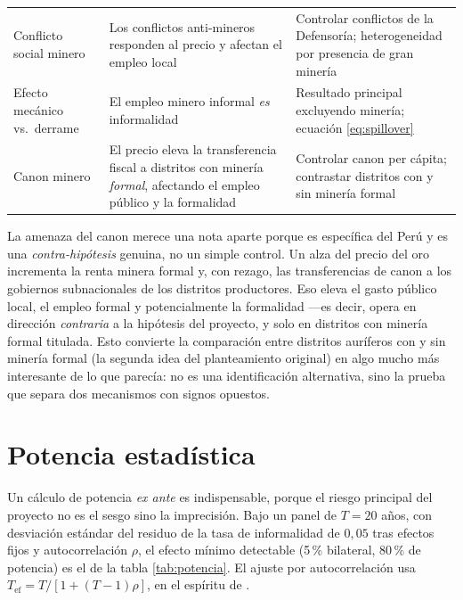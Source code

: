\documentclass[11pt,a4paper]{article}
\begin{document}
\begin{table}[h!]
\begin{tabularx}{\textwidth}{L{3.4cm} X L{4.6cm}}
\addlinespace
Conflicto social minero & Los conflictos anti-mineros responden al precio y afectan el empleo local & Controlar conflictos de la Defensoría; heterogeneidad por presencia de gran minería \\
\addlinespace
Efecto mecánico vs.\ derrame & El empleo minero informal \emph{es} informalidad & Resultado principal excluyendo minería; ecuación \eqref{eq:spillover} \\
\addlinespace
Canon minero & El precio eleva la transferencia fiscal a distritos con minería \emph{formal}, afectando el empleo público y la formalidad & Controlar canon per cápita; contrastar distritos con y sin minería formal \\
\bottomrule
\end{tabularx}
\end{table}

La amenaza del canon merece una nota aparte porque es específica del Perú y es una \emph{contra-hipótesis} genuina, no un simple control. Un alza del precio del oro incrementa la renta minera formal y, con rezago, las transferencias de canon a los gobiernos subnacionales de los distritos productores. Eso eleva el gasto público local, el empleo formal y potencialmente la formalidad ---es decir, opera en dirección \emph{contraria} a la hipótesis del proyecto, y solo en distritos con minería formal titulada. Esto convierte la comparación entre distritos auríferos con y sin minería formal (la segunda idea del planteamiento original) en algo mucho más interesante de lo que parecía: no es una identificación alternativa, sino la prueba que separa dos mecanismos con signos opuestos.

\section{Potencia estadística}\label{sec:potencia}

Un cálculo de potencia \emph{ex ante} es indispensable, porque el riesgo principal del proyecto no es el sesgo sino la imprecisión. Bajo un panel de $T=20$ años, con desviación estándar del residuo de la tasa de informalidad de $0{,}05$ tras efectos fijos y autocorrelación $\rho$, el efecto mínimo detectable (5\,\% bilateral, 80\,\% de potencia) es el de la tabla \ref{tab:potencia}. El ajuste por autocorrelación usa $T_{\text{ef}} = T/[1+(T-1)\rho]$, en el espíritu de \citet{bertrand2004}.
\end{document}
